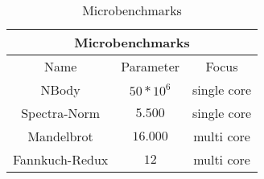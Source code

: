 \begin{table}[H]
    \centering
    \begin{tabular}{|| c | c | c ||}
    \hline
    \multicolumn{3}{||c||}{Microbenchmarks} \\ [0.5ex] \hline\hline
    Name & Parameter & Focus \\\hline
    NBody & $50*10^6$ & single core \\
    Spectra-Norm & $5.500$ & single core \\
    Mandelbrot & $16.000$ & multi core \\
    Fannkuch-Redux & $12$ & multi core \\\hline
    \end{tabular}
    \caption{Microbenchmarks}
    \label{tab:microbenchmarks}
\end{table}